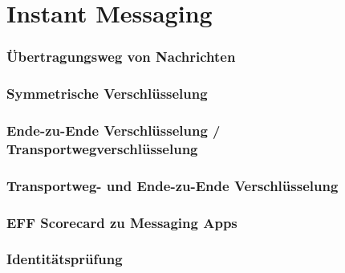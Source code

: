 \section{Instant Messaging}


\begin{frame}
  \frametitle{Übertragungsweg von Nachrichten}
\end{frame}

\begin{frame}
  \frametitle{Symmetrische Verschlüsselung}
\end{frame}

\begin{frame}
  \frametitle{Ende-zu-Ende Verschlüsselung / Transportwegverschlüsselung}
\end{frame}

\begin{frame}
  \frametitle{Transportweg- und Ende-zu-Ende Verschlüsselung}
\end{frame}

\begin{frame}
  \frametitle{EFF Scorecard zu Messaging Apps}
\end{frame}

\begin{frame}
  \frametitle{Identitätsprüfung}
\end{frame}
